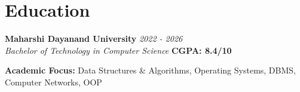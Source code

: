 \section{Education}

\noindent\textbf{Maharshi Dayanand University} \hfill \textit{2022 - 2026}\\
\textit{Bachelor of Technology in Computer Science} \hfill \textbf{CGPA: 8.4/10}
\begin{itemizecompact}
  \item \textbf{Academic Focus:} Data Structures \& Algorithms, Operating Systems, DBMS, Computer Networks, OOP
\end{itemizecompact}
